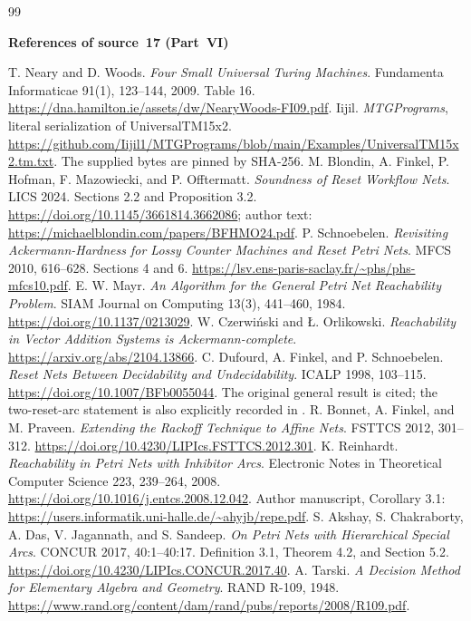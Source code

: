 \documentclass[11pt,letterpaper]{article}
\theoremstyle{definition}
\theoremstyle{remark}
\begin{document}
\begin{thebibliography}{99}
\item[]\textbf{References of source~17 (Part~VI)}

 T. Neary and D. Woods. \emph{Four Small Universal Turing Machines}. Fundamenta Informaticae 91(1), 123--144, 2009. Table 16. \url{https://dna.hamilton.ie/assets/dw/NearyWoods-FI09.pdf}.
 Iijil. \emph{MTGPrograms}, literal serialization of UniversalTM15x2. \url{https://github.com/Iijil1/MTGPrograms/blob/main/Examples/UniversalTM15x2.tm.txt}. The supplied bytes are pinned by SHA-256.
 M. Blondin, A. Finkel, P. Hofman, F. Mazowiecki, and P. Offtermatt. \emph{Soundness of Reset Workflow Nets}. LICS 2024. Sections 2.2 and Proposition 3.2. \url{https://doi.org/10.1145/3661814.3662086}; author text: \url{https://michaelblondin.com/papers/BFHMO24.pdf}.
 P. Schnoebelen. \emph{Revisiting Ackermann-Hardness for Lossy Counter Machines and Reset Petri Nets}. MFCS 2010, 616--628. Sections 4 and 6. \url{https://lsv.ens-paris-saclay.fr/~phs/phs-mfcs10.pdf}.
 E. W. Mayr. \emph{An Algorithm for the General Petri Net Reachability Problem}. SIAM Journal on Computing 13(3), 441--460, 1984. \url{https://doi.org/10.1137/0213029}.
 W. Czerwi\'nski and \L. Orlikowski. \emph{Reachability in Vector Addition Systems is Ackermann-complete}. \url{https://arxiv.org/abs/2104.13866}.
 C. Dufourd, A. Finkel, and P. Schnoebelen. \emph{Reset Nets Between Decidability and Undecidability}. ICALP 1998, 103--115. \url{https://doi.org/10.1007/BFb0055044}. The original general result is cited; the two-reset-arc statement is also explicitly recorded in \cite[Section 5.2]{rn:akshay}.
 R. Bonnet, A. Finkel, and M. Praveen. \emph{Extending the Rackoff Technique to Affine Nets}. FSTTCS 2012, 301--312. \url{https://doi.org/10.4230/LIPIcs.FSTTCS.2012.301}.
 K. Reinhardt. \emph{Reachability in Petri Nets with Inhibitor Arcs}. Electronic Notes in Theoretical Computer Science 223, 239--264, 2008. \url{https://doi.org/10.1016/j.entcs.2008.12.042}. Author manuscript, Corollary 3.1: \url{https://users.informatik.uni-halle.de/~ahyjb/repe.pdf}.
 S. Akshay, S. Chakraborty, A. Das, V. Jagannath, and S. Sandeep. \emph{On Petri Nets with Hierarchical Special Arcs}. CONCUR 2017, 40:1--40:17. Definition 3.1, Theorem 4.2, and Section 5.2. \url{https://doi.org/10.4230/LIPIcs.CONCUR.2017.40}.
 A. Tarski. \emph{A Decision Method for Elementary Algebra and Geometry}. RAND R-109, 1948. \url{https://www.rand.org/content/dam/rand/pubs/reports/2008/R109.pdf}.

\end{thebibliography}
\end{document}
